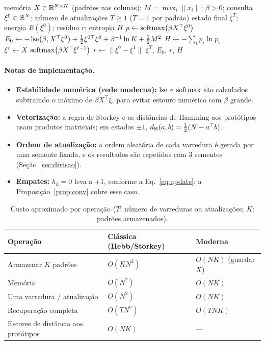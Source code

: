 \begin{algorithm}[htbp]
\caption{Recuperação e escores da rede de Hopfield moderna.}\label{alg:moderna}
\begin{algorithmic}[1]
\Require memória $X\in\mathbb{R}^{N\times K}$ (padrões nas colunas); $M=\max_i\|x_i\|$; $\beta>0$; consulta $\xi^0\in\mathbb{R}^N$;
número de atualizações $T\ge1$ ($T=1$ por padrão)
\Ensure estado final $\xi^{T}$; energia $E(\xi^0)$; resíduo $r$; entropia $H$
\State $p\gets\operatorname{softmax}\bigl(\beta X^{\top}\xi^0\bigr)$
\State $E_0\gets-\operatorname{lse}\bigl(\beta,X^{\top}\xi^0\bigr)+\tfrac12\xi^{0\top}\xi^0+\beta^{-1}\ln K+\tfrac12M^2$
\State $H\gets-\sum_ip_i\ln p_i$
  \State $\xi^{t}\gets X\,\operatorname{softmax}\bigl(\beta X^{\top}\xi^{t-1}\bigr)$ 
\EndFor
\State $r\gets\|\xi^{0}-\xi^{1}\|$
\State \Return $\xi^{T}$, $E_0$, $r$, $H$
\end{algorithmic}
\end{algorithm}

\paragraph{Notas de implementação.}
\begin{itemize}
  \item \textbf{Estabilidade numérica (rede moderna):} $\operatorname{lse}$ e $\operatorname{softmax}$ são calculados subtraindo o máximo de
        $\beta X^{\top}\xi$, para evitar estouro numérico com $\beta$ grande.
  \item \textbf{Vetorização:} a regra de Storkey e as distâncias de Hamming aos protótipos usam produtos
        matriciais; em estados $\pm1$, $d_{\mathrm{H}}(a,b)=\tfrac12(N-a^{\top}b)$.
  \item \textbf{Ordem de atualização:} a ordem aleatória de cada varredura é gerada por uma semente fixada, e
        os resultados são repetidos com 3 sementes (Seção~\ref{sec:divisao}).
  \item \textbf{Empates:} $h_k=0$ leva a $+1$, conforme a Eq.~\eqref{eq:update}; a Proposição~\ref{prop:conv} cobre
        esse caso.
\end{itemize}

\begin{table}[htbp]
\centering
\caption{Custo aproximado por operação ($T$: número de varreduras ou atualizações; $K$: padrões armazenados).}
\label{tab:complexidade}
\small
\begin{tabular}{@{}lll@{}}
\toprule
Operação & Clássica (Hebb/Storkey) & Moderna\\
\midrule
Armazenar $K$ padrões & $O(KN^2)$ & $O(NK)$ (guardar $X$)\\
Memória & $O(N^2)$ & $O(NK)$\\
Uma varredura / atualização & $O(N^2)$ & $O(NK)$\\
Recuperação completa & $O(TN^2)$ & $O(TNK)$\\
Escores de distância aos protótipos & $O(NK)$ & ---\\
\bottomrule
\end{tabular}
\end{table}
